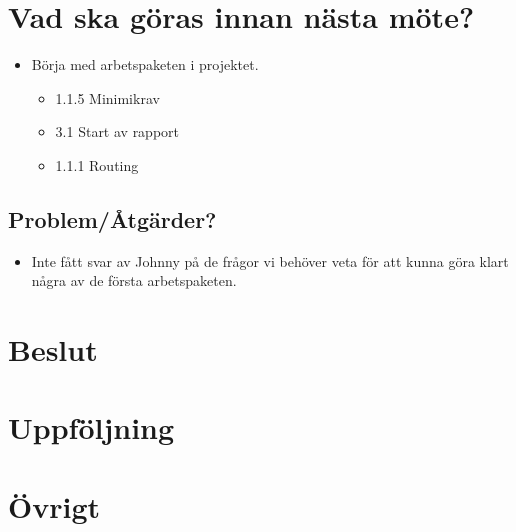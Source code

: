 \section*{Vad ska göras innan nästa möte?}
\begin{itemize}[noitemsep]
	\item Börja med arbetspaketen i projektet.
	\begin{itemize}
		\item 1.1.5 Minimikrav
		\item 3.1 Start av rapport
		\item 1.1.1 Routing
	\end{itemize}
\end{itemize}
\subsection*{Problem/Åtgärder?}
\begin{itemize}
	\item Inte fått svar av Johnny på de frågor vi behöver veta för att kunna göra klart några av de första arbetspaketen.
\end{itemize}

\section*{Beslut}

\section*{Uppföljning}

\newpage

\section*{Övrigt}
